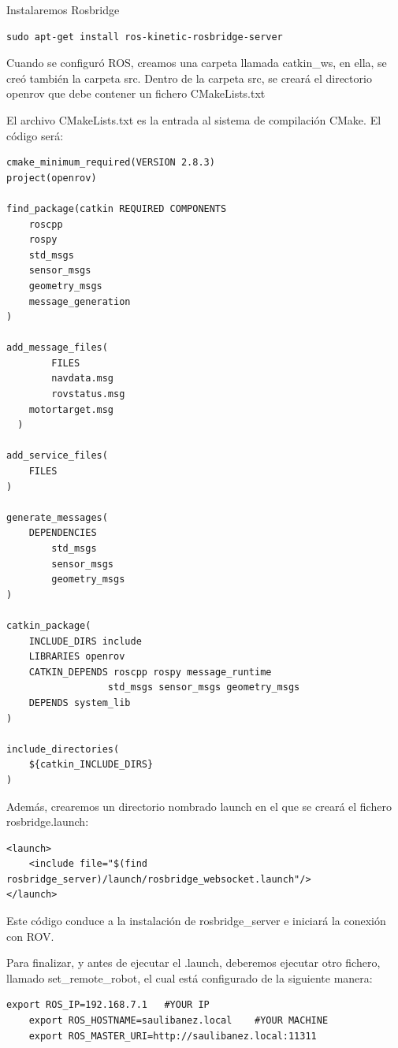Instalaremos Rosbridge
\begin{lstlisting}[caption=Rosbridge, label={lst:rosbridge}]
sudo apt-get install ros-kinetic-rosbridge-server
\end{lstlisting}

Cuando se configuró ROS, creamos una carpeta llamada catkin\_ws, en ella, se creó también la carpeta src. Dentro de la carpeta src, se creará el directorio openrov que debe contener un fichero CMakeLists.txt

El archivo CMakeLists.txt es la entrada al sistema de compilación CMake. El código será:

\begin{lstlisting}[caption=CMakeLists.txt, label={lst:cmakelists}]
cmake_minimum_required(VERSION 2.8.3)
project(openrov)

find_package(catkin REQUIRED COMPONENTS
  	roscpp
  	rospy
  	std_msgs
 	sensor_msgs
  	geometry_msgs
  	message_generation
)

add_message_files(
    	FILES
    	navdata.msg
    	rovstatus.msg
   	motortarget.msg
  )

add_service_files(
    FILES
)

generate_messages(
	DEPENDENCIES
    	std_msgs
    	sensor_msgs
    	geometry_msgs
)

catkin_package(
   	INCLUDE_DIRS include
   	LIBRARIES openrov
   	CATKIN_DEPENDS roscpp rospy message_runtime
                  std_msgs sensor_msgs geometry_msgs
   	DEPENDS system_lib
)

include_directories(
  	${catkin_INCLUDE_DIRS}
)
\end{lstlisting}


Además, crearemos un directorio nombrado launch en el que se creará el fichero rosbridge.launch:

\begin{lstlisting}[caption=websocket.launch, label={lst:launch}]
<launch>
 	<include file="$(find rosbridge_server)/launch/rosbridge_websocket.launch"/>
</launch>
\end{lstlisting}

Este código conduce a la instalación de rosbridge\_server e iniciará la conexión con ROV.

Para finalizar, y antes de ejecutar el .launch, deberemos ejecutar otro fichero, llamado set\_remote\_robot, el cual está configurado de la siguiente manera:
\begin{lstlisting}[caption=set\_remote\_robot, label={lst:remote}]
	export ROS_IP=192.168.7.1 	#YOUR IP
	export ROS_HOSTNAME=saulibanez.local 	#YOUR MACHINE
	export ROS_MASTER_URI=http://saulibanez.local:11311
\end{lstlisting}

